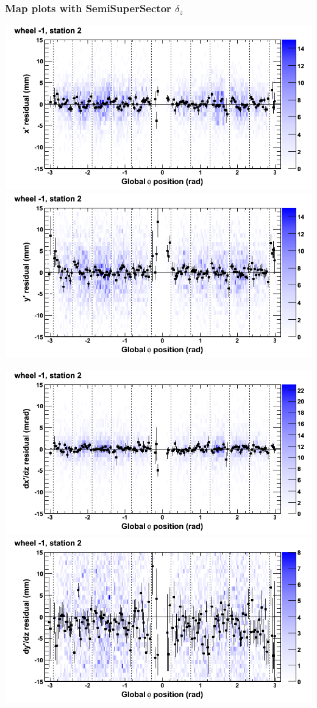 \documentclass[compress]{beamer}
\begin{document}
\begin{frame}
\frametitle{Map plots with SemiSuperSector $\delta_z$}
\includegraphics[width=0.5\linewidth]{zfit_mapplots/DTvsphi_st2whB_x.png}
\includegraphics[width=0.5\linewidth]{zfit_mapplots/DTvsphi_st2whB_y.png}

\includegraphics[width=0.5\linewidth]{zfit_mapplots/DTvsphi_st2whB_dxdz.png}
\includegraphics[width=0.5\linewidth]{zfit_mapplots/DTvsphi_st2whB_dydz.png}
\end{frame}
\end{document}
